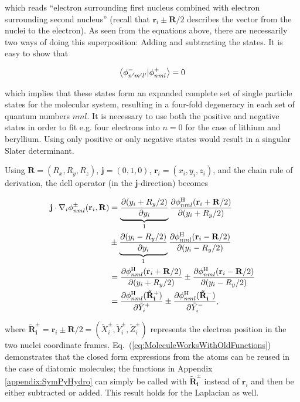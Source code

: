 which reads ``electron surrounding first nucleus combined with electron surrounding second nucleus'' (recall that $\mathbf{r}_i \pm \mathbf{R}/2$ describes the vector from the nuclei to the electron). As seen from the equations above, there are necessarily two ways of doing this superposition: Adding and subtracting the states. It is easy to show that 

\begin{equation}
 \left\langle \phi_{n'm'l'}^- | \phi_{nml}^+\right\rangle = 0
\end{equation}

which implies that these states form an expanded complete set of single particle states for the molecular system, resulting in a four-fold degeneracy in each set of quantum numbers $nml$. It is necessary to use both the positive and negative states in order to fit e.g. four electrons into $n=0$ for the case of lithium and beryllium. Using only positive or only negative states would result in a singular Slater determinant.

Using $\mathbf{R} = \left(R_x, R_y, R_z\right)$, $\mathbf{j} = (0, 1, 0)$, $\mathbf{r}_i = \left(x_i, y_i, z_i\right)$,  and the chain rule of derivation, the dell operator (in the $\mathbf{j}$-direction) becomes

\begin{align}
 \mathbf{j}\cdot \nabla_i \phi_{nml}^\pm (\mathbf{r}_i, \mathbf{R}) &= \underbrace{\frac{\partial (y_i + R_y/2)}{\partial y_i}}_{1}\frac{\partial \phi_{nml}^\mathrm{H}(\mathbf{r}_i + \mathbf{R}/2)}{\partial (y_i + R_y/2)} \notag \\
  &\pm \underbrace{\frac{\partial (y_i - R_y/2)}{\partial y_i}}_{1}\frac{\partial \phi_{nml}^\mathrm{H}(\mathbf{r}_i - \mathbf{R}/2)}{\partial (y_i - R_y/2)} \notag\\
  &= \frac{\partial \phi_{nml}^\mathrm{H}(\mathbf{r}_i + \mathbf{R}/2)}{\partial (y_i + R_y/2)} \pm \frac{\partial \phi_{nml}^\mathrm{H}(\mathbf{r}_i - \mathbf{R}/2)}{\partial (y_i - R_y/2)} \notag\\
  &=  \frac{\partial \phi_{nml}^\mathrm{H}(\mathbf{\tilde R_i^+})}{\partial \tilde Y_i^+} \pm \frac{\partial \phi_{nml}^\mathrm{H}(\mathbf{\tilde R_i^-})}{\partial \tilde Y_i^-}, \label{eq:MoleculeWorksWithOldFunctions}
\end{align}

where $\mathbf{\tilde R_i^\pm} = \mathbf{r}_i \pm \mathbf{R}/2 = (\tilde X_i^\pm, \tilde Y_i^\pm, \tilde Z_i^\pm)$ represents the electron position in the two nuclei coordinate frames. Eq.~(\ref{eq:MoleculeWorksWithOldFunctions}) demonstrates that the closed form expressions from the atoms can be reused in the case of diatomic molecules; the functions in Appendix \ref{appendix:SymPyHydro} can simply be called  with $\mathbf{\tilde R_i^\pm}$ instead of $\mathbf{r}_i$ and then be either subtracted or added. This result holds for the Laplacian as well.

